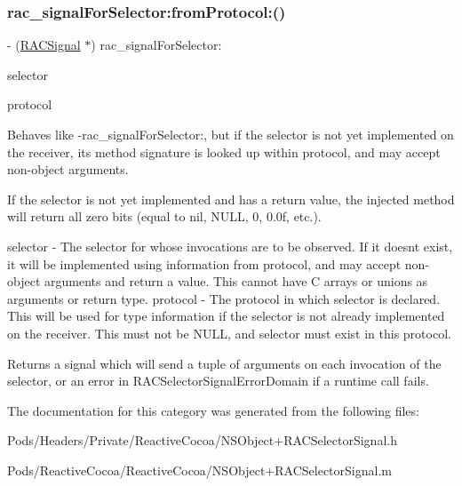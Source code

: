 \subsubsection{\texorpdfstring{rac\+\_\+signal\+For\+Selector\+:from\+Protocol\+:()}{rac\_signalForSelector:fromProtocol:()}\hspace{0.1cm}{\footnotesize\ttfamily [3/3]}}
{\footnotesize\ttfamily -\/ (\mbox{\hyperlink{interface_r_a_c_signal}{R\+A\+C\+Signal}} $\ast$) rac\+\_\+signal\+For\+Selector\+: \begin{DoxyParamCaption}\item[{(S\+EL)}]{selector }\item[{fromProtocol:(Protocol $\ast$)}]{protocol }\end{DoxyParamCaption}}

Behaves like -\/rac\+\_\+signal\+For\+Selector\+:, but if the selector is not yet implemented on the receiver, its method signature is looked up within {\ttfamily protocol}, and may accept non-\/object arguments.

If the selector is not yet implemented and has a return value, the injected method will return all zero bits (equal to {\ttfamily nil}, {\ttfamily N\+U\+LL}, 0, 0.\+0f, etc.).

selector -\/ The selector for whose invocations are to be observed. If it doesn\textquotesingle{}t exist, it will be implemented using information from {\ttfamily protocol}, and may accept non-\/object arguments and return a value. This cannot have C arrays or unions as arguments or return type. protocol -\/ The protocol in which {\ttfamily selector} is declared. This will be used for type information if the selector is not already implemented on the receiver. This must not be {\ttfamily N\+U\+LL}, and {\ttfamily selector} must exist in this protocol.

Returns a signal which will send a tuple of arguments on each invocation of the selector, or an error in R\+A\+C\+Selector\+Signal\+Error\+Domain if a runtime call fails. 

The documentation for this category was generated from the following files\+:\begin{DoxyCompactItemize}
\item 
Pods/\+Headers/\+Private/\+Reactive\+Cocoa/N\+S\+Object+\+R\+A\+C\+Selector\+Signal.\+h\item 
Pods/\+Reactive\+Cocoa/\+Reactive\+Cocoa/N\+S\+Object+\+R\+A\+C\+Selector\+Signal.\+m\end{DoxyCompactItemize}
